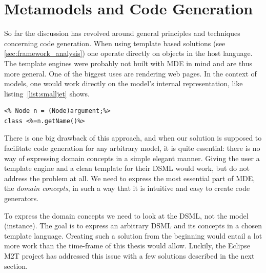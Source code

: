 \section{Metamodels and Code Generation}\label{sec:metamodels_and_cg}
So far the discussion has revolved around general principles and techniques concerning code generation. When using template based solutions (see \ref{sec:framework_analysis}) one operate directly on objects in the host language. The template engines were probably not built with MDE in mind and are thus more general. One of the biggest uses are rendering web pages. In the context of models, one would work directly on the model's internal representation, like listing~\ref{list:smalljet} shows. 
\lstset{caption=Simplified Java Emitter Templates (JET) example of using an object directly.,label=list:smalljet,captionpos=b}
\begin{table}[ht]
  \centering
\begin{lstlisting}[showstringspaces=false]
<% Node n = (Node)argument;%>
class <%=n.getName()%> 
\end{lstlisting}
\end{table}
There is one big drawback of this approach, and when our solution is supposed to facilitate code generation for any arbitrary model, it is quite essential: there is no way of expressing domain concepts in a simple elegant manner. Giving the user a template engine and a clean template for their DSML would work, but do not address the problem at all. We need to express the most essential part of MDE, the \emph{domain concepts}, in such a way that it is intuitive and easy to create code generators.

To express the domain concepts we need to look at the DSML, not the model (instance). The goal is to express an arbitrary DSML and its concepts in a chosen template language. Creating such a solution from the beginning would entail a lot more work than the time-frame of this thesis would allow. Luckily, the Eclipse M2T project has addressed this issue with a few solutions described in the next section. 



